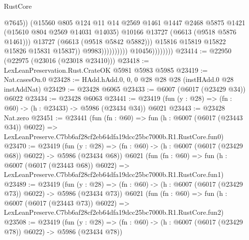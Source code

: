 \begin{lexlean}{RustCore}
\begin{coremodule}
                                                  @7645))
                                              (@15560
                                                @805
                                                @124
                                                @11
                                                @14
                                                @2569
                                                @1461
                                                @1447
                                                @2468
                                                @5875
                                                @1421
                                                (@15610 @804 @2569 @14031 @14035)
                                                @10166
                                                @13727
                                                (@6613 (@9518 @5876 @1461)))
                                              @13727
                                              (@6613 (@9518 @5842 @5882)))
                                            @15816
                                            @15819
                                            @15822
                                            @15826
                                            @15831
                                            @15837))
                                        @9983))))))))))
                    @10456))))))))
@23414 := @22950 (@22975 (@23016 (@23018 @23410)))
@23418 := LexLeanPreservation.Rust.CrateOK @5981 @5983 @5985
@23419 := Nat.casesOn.{0}
@23428 := HAdd.hAdd.{0, 0, 0} @28 @28 @28 (instHAdd.{0} @28 instAddNat)
@23429 := @23428 @6065
@23433 := @6007 (@6017 (@23429 @34)) @6022
@23434 := @23428 @6063
@23441 := @23419 (fun (y : @28) => (fn : @60) -> (h : @23433) -> @5986 (@23434 @34)) @6021
@23443 := @23428 Nat.zero
@23451 := @23441
    (fun (fn : @60) =>
    fun (h : @6007 (@6017 (@23443 @34)) @6022) =>
    LexLeanPreserve.C7bb6af28cf2eb64dfa19dcc25bc7000b.R1.RustCore.fun0)
@23470 := @23419
    (fun (y : @28) => (fn : @60) -> (h : @6007 (@6017 (@23429 @68)) @6022) -> @5986 (@23434 @68))
    @6021
    (fun (fn : @60) =>
    fun (h : @6007 (@6017 (@23443 @68)) @6022) =>
    LexLeanPreserve.C7bb6af28cf2eb64dfa19dcc25bc7000b.R1.RustCore.fun1)
@23489 := @23419
    (fun (y : @28) => (fn : @60) -> (h : @6007 (@6017 (@23429 @73)) @6022) -> @5986 (@23434 @73))
    @6021
    (fun (fn : @60) =>
    fun (h : @6007 (@6017 (@23443 @73)) @6022) =>
    LexLeanPreserve.C7bb6af28cf2eb64dfa19dcc25bc7000b.R1.RustCore.fun2)
@23508 := @23419
    (fun (y : @28) => (fn : @60) -> (h : @6007 (@6017 (@23429 @78)) @6022) -> @5986 (@23434 @78))

\end{coremodule}
\end{lexlean}
